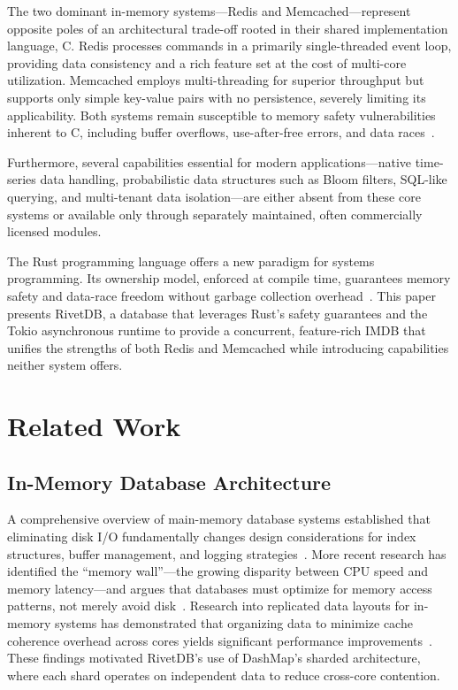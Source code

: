 \documentclass[conference,a4paper]{IEEEtran}
\begin{document}
The two dominant in-memory systems---Redis and Memcached---represent opposite poles of an architectural trade-off rooted in their shared implementation language, C. Redis processes commands in a primarily single-threaded event loop, providing data consistency and a rich feature set at the cost of multi-core utilization. Memcached employs multi-threading for superior throughput but supports only simple key-value pairs with no persistence, severely limiting its applicability. Both systems remain susceptible to memory safety vulnerabilities inherent to C, including buffer overflows, use-after-free errors, and data races~\cite{jung2021}.

Furthermore, several capabilities essential for modern applications---native time-series data handling, probabilistic data structures such as Bloom filters, SQL-like querying, and multi-tenant data isolation---are either absent from these core systems or available only through separately maintained, often commercially licensed modules.

The Rust programming language offers a new paradigm for systems programming. Its ownership model, enforced at compile time, guarantees memory safety and data-race freedom without garbage collection overhead~\cite{jung2021}. This paper presents RivetDB, a database that leverages Rust's safety guarantees and the Tokio asynchronous runtime to provide a concurrent, feature-rich IMDB that unifies the strengths of both Redis and Memcached while introducing capabilities neither system offers.

\section{Related Work}

\subsection{In-Memory Database Architecture}

A comprehensive overview of main-memory database systems established that eliminating disk I/O fundamentally changes design considerations for index structures, buffer management, and logging strategies~\cite{larson2006}. More recent research has identified the ``memory wall''---the growing disparity between CPU speed and memory latency---and argues that databases must optimize for memory access patterns, not merely avoid disk~\cite{chronis2025}. Research into replicated data layouts for in-memory systems has demonstrated that organizing data to minimize cache coherence overhead across cores yields significant performance improvements~\cite{sudhir2022}. These findings motivated RivetDB's use of DashMap's sharded architecture, where each shard operates on independent data to reduce cross-core contention.
\end{document}
